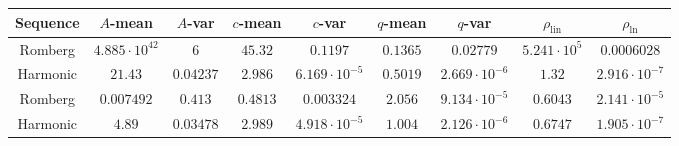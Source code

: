 \begin{table}[H]
    \centering
    \small
    \begin{tabular}{c||c|c|c|c|c|c|c|c}
Sequence & \(A\)-mean & \(A\)-var & \(c\)-mean & \(c\)-var & \(q\)-mean & \(q\)-var & \(\rho_{\operatorname{lin}}\) & \(\rho_{\ln}\)\\\hline
\rowcolor{red}
Romberg & \(4.885\cdot 10^{42}\) & \(6\) & \(45.32\) & \(0.1197\) & \(0.1365\) & \(0.02779\) & \(5.241\cdot 10^5\) & \(0.0006028\) \\
\rowcolor{green}
Harmonic & \(21.43\) & \(0.04237\) & \(2.986\) & \(6.169\cdot 10^{-5}\) & \(0.5019\) & \(2.669\cdot 10^{-6}\) & \(1.32\) & \(2.916\cdot 10^{-7}\) \\
\rowcolor{green}
Romberg & \(0.007492\) & \(0.413\) & \(0.4813\) & \(0.003324\) & \(2.056\) & \(9.134\cdot 10^{-5}\) & \(0.6043\) & \(2.141\cdot 10^{-5}\) \\
\rowcolor{green}
Harmonic & \(4.89\) & \(0.03478\) & \(2.989\) & \(4.918\cdot 10^{-5}\) & \(1.004\) & \(2.126\cdot 10^{-6}\) & \(0.6747\) & \(1.905\cdot 10^{-7}\) \\
    \end{tabular}
    \label{tab:my_label}
\end{table}


